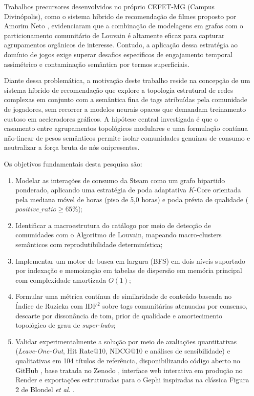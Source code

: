 \documentclass[conference]{IEEEtran}
\begin{document}
Trabalhos precursores desenvolvidos no próprio CEFET-MG (Campus Divinópolis), como o sistema híbrido de recomendação de filmes proposto por Amorim Neto \cite{amorim2024}, evidenciaram que a combinação de modelagens em grafos com o particionamento comunitário de Louvain é altamente eficaz para capturar agrupamentos orgânicos de interesse. Contudo, a aplicação dessa estratégia ao domínio de jogos exige superar desafios específicos de engajamento temporal assimétrico e contaminação semântica por termos superficiais.

Diante dessa problemática, a motivação deste trabalho reside na concepção de um sistema híbrido de recomendação que explore a topologia estrutural de redes complexas em conjunto com a semântica fina de tags atribuídas pela comunidade de jogadores, sem recorrer a modelos neurais opacos que demandam treinamento custoso em aceleradores gráficos. A hipótese central investigada é que o casamento entre agrupamentos topológicos modulares e uma formulação contínua não-linear de pesos semânticos permite isolar comunidades genuínas de consumo e neutralizar a força bruta de nós onipresentes.

Os objetivos fundamentais desta pesquisa são:
\begin{enumerate}
    \item Modelar as interações de consumo da Steam como um grafo bipartido ponderado, aplicando uma estratégia de poda adaptativa $K$-Core orientada pela mediana móvel de horas (piso de 5,0 horas) e poda prévia de qualidade ($positive\_ratio \ge 65\%$);
    \item Identificar a macroestrutura do catálogo por meio de detecção de comunidades com o Algoritmo de Louvain, mapeando macro-clusters semânticos com reprodutibilidade determinística;
    \item Implementar um motor de busca em largura (BFS) em dois níveis suportado por indexação e memoização em tabelas de dispersão em memória principal com complexidade amortizada $O(1)$;
    \item Formular uma métrica contínua de similaridade de conteúdo baseada no Índice de Ruzicka com $\text{IDF}^2$ sobre tags comunitárias atenuadas por consenso, descarte por dissonância de tom, prior de qualidade e amortecimento topológico de grau de \textit{super-hubs};
    \item Validar experimentalmente a solução por meio de avaliações quantitativas (\textit{Leave-One-Out}, Hit Rate@10, NDCG@10 e análises de sensibilidade) e qualitativas em 104 títulos de referência, disponibilizando código aberto no GitHub \cite{github}, base tratada no Zenodo \cite{zenodo}, interface web interativa em produção no Render \cite{render} e exportações estruturadas para o Gephi inspiradas na clássica Figura 2 de Blondel \textit{et al.} \cite{blondel2008}.
\end{enumerate}
\end{document}
